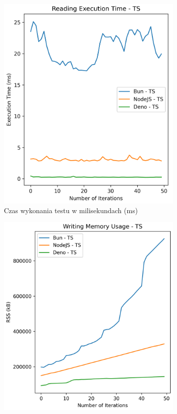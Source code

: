 \begin{figure}[H]
  \centering
  \begin{subfigure}[b]{0.42\textwidth}
    \centering
    \includegraphics[width=\textwidth]{Figures/files/files_writing_50_2000_50_ts_time.png}
    \caption{Czas wykonania testu w milisekundach (ms)}
    \label{fig:file_e2_writing_ts_time}
  \end{subfigure}
  \begin{subfigure}[b]{0.42\textwidth}
    \centering
    \includegraphics[width=\textwidth]{Figures/files/files_writing_50_2000_50_ts_memory.png}

\end{subfigure}
\end{figure}
